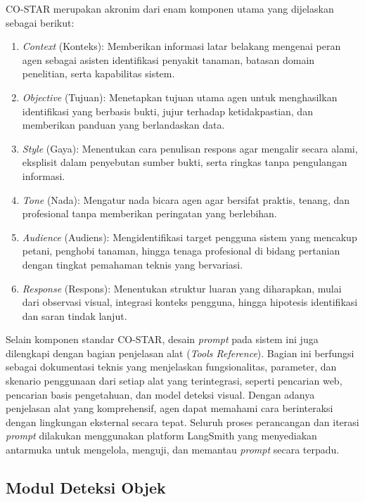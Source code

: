 CO-STAR merupakan akronim dari enam komponen utama yang dijelaskan sebagai berikut:
\begin{enumerate}[nosep]
    \item \textit{Context} (Konteks): Memberikan informasi latar belakang mengenai peran agen sebagai asisten identifikasi penyakit tanaman, batasan domain penelitian, serta kapabilitas sistem.
    \item \textit{Objective} (Tujuan): Menetapkan tujuan utama agen untuk menghasilkan identifikasi yang berbasis bukti, jujur terhadap ketidakpastian, dan memberikan panduan yang berlandaskan data.
    \item \textit{Style} (Gaya): Menentukan cara penulisan respons agar mengalir secara alami, eksplisit dalam penyebutan sumber bukti, serta ringkas tanpa pengulangan informasi.
    \item \textit{Tone} (Nada): Mengatur nada bicara agen agar bersifat praktis, tenang, dan profesional tanpa memberikan peringatan yang berlebihan.
    \item \textit{Audience} (Audiens): Mengidentifikasi target pengguna sistem yang mencakup petani, penghobi tanaman, hingga tenaga profesional di bidang pertanian dengan tingkat pemahaman teknis yang bervariasi.
    \item \textit{Response} (Respons): Menentukan struktur luaran yang diharapkan, mulai dari observasi visual, integrasi konteks pengguna, hingga hipotesis identifikasi dan saran tindak lanjut.
\end{enumerate}

Selain komponen standar CO-STAR, desain \textit{prompt} pada sistem ini juga dilengkapi dengan bagian penjelasan alat (\textit{Tools Reference}). Bagian ini berfungsi sebagai dokumentasi teknis yang menjelaskan fungsionalitas, parameter, dan skenario penggunaan dari setiap alat yang terintegrasi, seperti pencarian web, pencarian basis pengetahuan, dan model deteksi visual. Dengan adanya penjelasan alat yang komprehensif, agen dapat memahami cara berinteraksi dengan lingkungan eksternal secara tepat. Seluruh proses perancangan dan iterasi \textit{prompt} dilakukan menggunakan platform LangSmith yang menyediakan antarmuka untuk mengelola, menguji, dan memantau \textit{prompt} secara terpadu.

\subsection{Modul Deteksi Objek}

